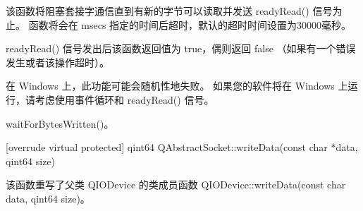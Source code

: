 该函数将阻塞套接字通信直到有新的字节可以读取并发送 readyRead() 信号为止。 函数将会在 msecs 指定的时间后超时，默认的超时时间设置为30000毫秒。

readyRead() 信号发出后该函数返回值为 true，偶则返回 false （如果有一个错误发生或者该操作超时）。

\begin{notice}
在 Windows 上，此功能可能会随机性地失败。 如果您的软件将在 Windows 上运行，请考虑使用事件循环和 readyRead() 信号。
\end{notice}


\begin{notice}[另请查阅]
waitForBytesWritten()。
\end{notice}


\splitLine

[overrude virtual protected] qint64 QAbstractSocket::writeData(const char *data, qint64 size)

该函数重写了父类 QIODevice 的类成员函数 QIODevice::writeData(const
char data, qint64 size)。

